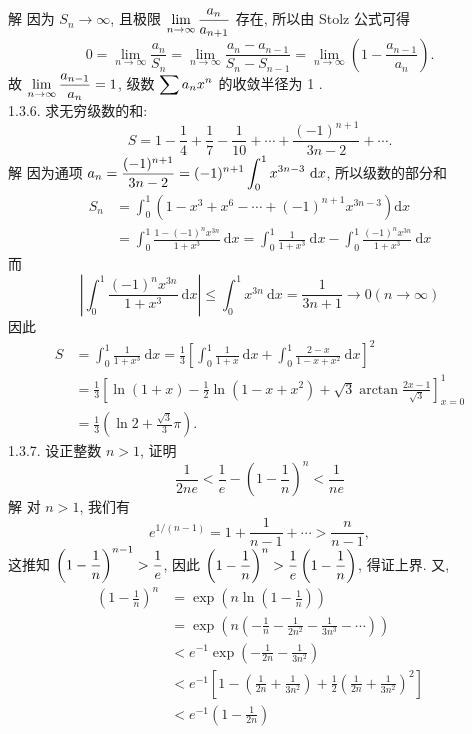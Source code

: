 \documentclass[a4paper,11pt,UTF8]{article}
\begin{document}
解 因为 $S_n \rightarrow \infty$, 且极限 $\displaystyle \displaystyle \lim _{n \rightarrow \infty} \frac{a_n}{a_{n+1}}$ 存在, 所以由 Stolz 公式可得
$$
0=\lim _{n \rightarrow \infty} \frac{a_n}{S_n}=\lim _{n \rightarrow \infty} \frac{a_n-a_{n-1}}{S_n-S_{n-1}}=\lim _{n \rightarrow \infty}\left(1-\frac{a_{n-1}}{a_n}\right) .
$$
故 $\displaystyle \displaystyle \lim _{n \rightarrow \infty} \frac{a_{n-1}}{a_n}=1$, 级数 $\displaystyle \displaystyle \sum a_n x^n$ 的收敛半径为 1 .\\
1.3.6. 求无穷级数的和:
$$
S=1-\frac{1}{4}+\frac{1}{7}-\frac{1}{10}+\cdots+\frac{(-1)^{n+1}}{3 n-2}+\cdots .
$$
解 因为通项 $\displaystyle \displaystyle a_n=\frac{(-1)^{n+1}}{3 n-2}=(-1)^{n+1} \int_0^1 x^{3 n-3} \mathrm{~d} x$, 所以级数的部分和
$$
\begin{aligned}
	S_n & =\int_0^1\left(1-x^3+x^6-\cdots+(-1)^{n+1} x^{3 n-3}\right) \mathrm{d} x \\
	& =\int_0^1 \frac{1-(-1)^n x^{3 n}}{1+x^3} \mathrm{~d} x=\int_0^1 \frac{1}{1+x^3} \mathrm{~d} x-\int_0^1 \frac{(-1)^n x^{3 n}}{1+x^3} \mathrm{~d} x
\end{aligned}
$$
而
$$
\left|\int_0^1 \frac{(-1)^n x^{3 n}}{1+x^3} \mathrm{~d} x\right| \leq \int_0^1 x^{3 n} \mathrm{~d} x=\frac{1}{3 n+1} \rightarrow 0(n \rightarrow \infty)
$$
因此
$$
\begin{aligned}
	S & =\int_0^1 \frac{1}{1+x^3} \mathrm{~d} x=\frac{1}{3}\left[\int_0^1 \frac{1}{1+x} \mathrm{~d} x+\int_0^1 \frac{2-x}{1-x+x^2} \mathrm{~d} x\right]^2 \\
	& =\frac{1}{3}\left[\ln (1+x)-\frac{1}{2} \ln \left(1-x+x^2\right)+\sqrt{3} \arctan \frac{2 x-1}{\sqrt{3}}\right]_{x=0}^1 \\
	& =\frac{1}{3}\left(\ln 2+\frac{\sqrt{3}}{3} \pi\right) .
\end{aligned}
$$
1.3.7. 设正整数 $n>1$, 证明
$$
\frac{1}{2 n e}<\frac{1}{e}-\left(1-\frac{1}{n}\right)^n<\frac{1}{n e}
$$
解 对 $n>1$, 我们有
$$
e^{1 /(n-1)}=1+\frac{1}{n-1}+\cdots>\frac{n}{n-1},
$$
这推知 $\displaystyle \displaystyle \left(1-\frac{1}{n}\right)^{n-1}>\frac{1}{e}$, 因此 $\displaystyle \displaystyle \left(1-\frac{1}{n}\right)^n>\frac{1}{e}\left(1-\frac{1}{n}\right)$, 得证上界.
又,
$$
\begin{aligned}
	\left(1-\frac{1}{n}\right)^n & =\exp \left(n \ln \left(1-\frac{1}{n}\right)\right) \\
	& =\exp \left(n\left(-\frac{1}{n}-\frac{1}{2 n^2}-\frac{1}{3 n^3}-\cdots\right)\right) \\
	& <e^{-1} \exp \left(-\frac{1}{2 n}-\frac{1}{3 n^2}\right) \\
	& <e^{-1}\left[1-\left(\frac{1}{2 n}+\frac{1}{3 n^2}\right)+\frac{1}{2}\left(\frac{1}{2 n}+\frac{1}{3 n^2}\right)^2\right] \\
	& <e^{-1}\left(1-\frac{1}{2 n}\right)
\end{aligned}
$$
\end{document}
